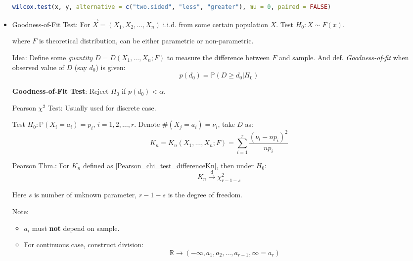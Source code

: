 \begin{itemize}
\begin{rcode}
\begin{lstlisting}[language=R]
wilcox.test(x, y, alternative = c("two.sided", "less", "greater"), mu = 0, paired = FALSE)
\end{lstlisting}
\end{rcode}




        \item Goodness-of-Fit Test: For $\vec{X}=(X_1,X_2,\ldots,X_n)$ i.i.d. from some certain population $X$. Test $H_0:X\sim F(x)$.
        
        where $F$ is theoretical distribution, can be either parametric or non-parametric.

        Idea: Define some \textit{quantity} $D=D(X_1,\ldots,X_n;F)$ to measure the difference between $F$ and sample. And def. \textit{Goodness-of-fit} when observed value of $D$ (say $d_0$) is given:
        \begin{equation}p(d_0)=\mathbb{P}(D\geq d_0|H_0)\end{equation}

        \textbf{Goodness-of-Fit Test}: Reject $H_0$ if $p(d_0)<\alpha$.


            Pearson $\chi^2$ Test: Usually used for discrete case. 
            
            Test $H_0:\mathbb{P}(X_i=a_i)=p_i,\, i=1,2,\ldots,r$. Denote $\#(X_j=a_i)=\nu_i$, take $D$ as:
            \begin{equation}\label{Pearson_chi_test_differenceKn}
                K_n=K_n(X_1,\ldots,X_n;F)=\sum_{i=1}^r\frac{(\nu_i-np_i)^2}{np_i}
            \end{equation}

            Pearson Thm.: For $K_n$ defined as \autoref{Pearson_chi_test_differenceKn}, then under $H_0$:
            \begin{equation}
                K_n\xrightarrow[]{\mathrm{d}}\chi^2_{r-1-s}
            \end{equation} 

            Here $s$ is number of unknown parameter, $r-1-s$ is the degree of freedom.

            Note:
            \begin{itemize}
                \item $a_i$ must \textbf{not} depend on sample.
                \item For continuous case, construct division:
                \begin{equation}\mathbb{R}\rightarrow(-\infty,a_1,a_2,\ldots,a_{r-1},\infty=a_r) \end{equation}


\end{itemize}
\end{itemize}
